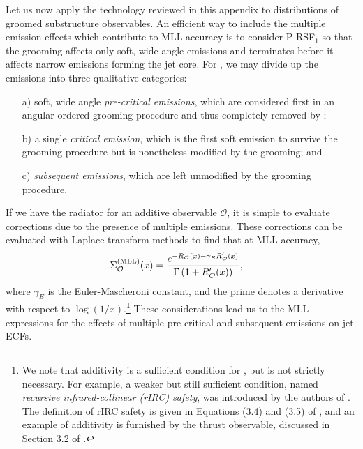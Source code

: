 \documentclass[letterpaper,11pt]{article}
\begin{document}
Let us now apply the technology reviewed in this appendix to distributions of  groomed substructure observables.
%
An efficient way to include the multiple emission effects which contribute to MLL accuracy is to consider P-RSF\(_1\) so that the grooming affects only soft, wide-angle emissions and terminates before it affects narrow emissions forming the jet core.
%
For , we may divide up the emissions into three qualitative categories:

\begin{enumerate}
    \item[a)]
    soft, wide angle \textit{pre-critical emissions}, which are considered first in an angular-ordered grooming procedure and thus completely removed by ;

    \item[b)]
    a single \textit{critical emission}, which is the first soft emission to survive the grooming procedure but is nonetheless modified by the grooming; and

    \item[c)]
    \textit{subsequent emissions}, which are left unmodified by the grooming procedure.
\end{enumerate}

If we have the radiator for an additive observable \(\mathcal O\), it is simple to evaluate corrections due to the presence of multiple emissions.
%
These corrections can be evaluated with Laplace transform methods \cite{Banfi:2004yd} to find that at MLL accuracy,
%
\begin{align}
    \Sigma^{\rm (MLL)}_{\mathcal O}(x)
    &=
   \frac{
   e^{-R_{\mathcal O}(x)
   -
   \gamma_E R'_{\mathcal O}(x)}
   }
   {\Gamma
   \left(1 + R'_{\mathcal O}(x)\right)
   }
   \label{eqn:mll_general_dist}
   ,
\end{align}
%
where \(\gamma_E\) is the Euler-Mascheroni constant, and the prime denotes a derivative with respect to \(\log(1/x)\).\footnote{
We note that additivity is a sufficient condition for , but is not strictly necessary.
%
For example, a weaker but still sufficient condition, named \textit{recursive infrared-collinear (rIRC) safety}, was introduced by the authors of .
%
The definition of rIRC safety is given in Equations (3.4) and (3.5) of , and an example of additivity is furnished by the thrust observable, discussed in Section 3.2 of .
}
%
%
These considerations lead us to the MLL expressions for the effects of multiple pre-critical and subsequent emissions on jet ECFs.
\end{document}
